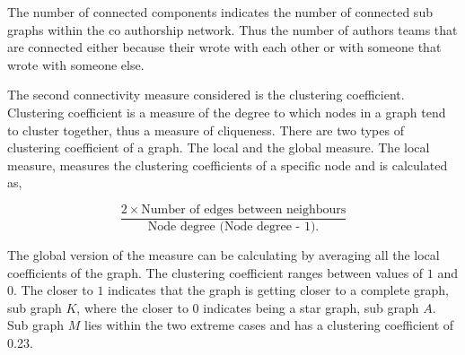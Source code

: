 \documentclass{article}
\begin{document}
The number of connected components indicates the number of connected sub graphs
within the co authorship network. Thus the number of authors teams that are connected
either because their wrote with each other or with someone that wrote with someone
else.

The second connectivity measure considered is the clustering coefficient. Clustering
coefficient is a measure of the degree to which nodes in a graph tend to
cluster together, thus a measure of cliqueness.
There are two types of clustering coefficient of a graph. The local and the global
measure. The local measure, measures the clustering coefficients of a specific
node and is calculated as,

\[\frac{2 \times \text{Number of edges between neighbours}}{\text{Node degree (Node degree - 1).}}\]

The global version of the measure can be calculating by averaging all the local
coefficients of the graph. The clustering coefficient ranges between values of
\(1\) and \(0\). The closer to \(1\) indicates that the graph is getting closer to
a complete graph, sub graph \(K\), where the closer to \(0\) indicates being a
star graph, sub graph \(A\). Sub graph \(M\) lies within the two extreme cases
and has a clustering coefficient of 0.23.
\end{document}
